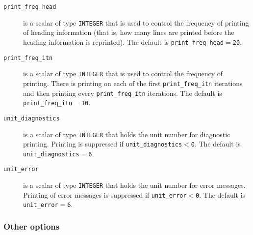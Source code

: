 \begin{description}

\item[\texttt{print\_freq\_head}] is a scalar of type  {\tt INTEGER}
that is used to control the frequency of printing 
of heading information (that is, how many
lines are printed before the heading information is reprinted). 
The default is {\tt print\_freq\_head$=$\tt 20}.

\item[\texttt{print\_freq\_itn}] is a scalar of type  {\tt INTEGER}
that is used to control the frequency of printing.
There is printing on each of the first {\tt print\_freq\_itn} iterations 
and then printing  every {\tt print\_freq\_itn}
iterations.
The default is {\tt print\_freq\_itn$=$\tt 10}.



\item[\texttt{unit\_diagnostics}] is a scalar  of type
{\tt INTEGER} that holds the
unit number for diagnostic printing. Printing is suppressed if
{\tt unit\_diagnostics$<$0}.
The default is {\tt unit\_diagnostics$=$6}.

\item[\texttt{unit\_error}] is a scalar of type  {\tt INTEGER} that holds the
unit number for error messages.
Printing of error messages
is suppressed if {\tt unit\_error$<$0}.
The default is {\tt unit\_error$=$6}.


\end{description}



\subsubsection*{Other options}

